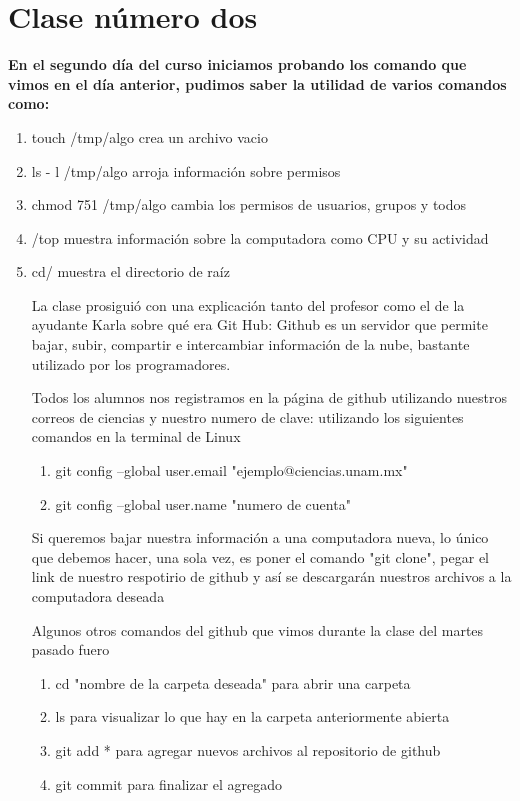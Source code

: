 \documentclass{book}
\begin{document}
\chapter{Clase número dos}
\textbf{En el segundo día del curso iniciamos probando los comando que vimos en el día anterior, pudimos saber la utilidad  de varios comandos como:}


\begin{enumerate}
	\item touch /tmp/algo crea un archivo vacio
	\item ls - l /tmp/algo arroja información sobre permisos
	\item chmod 751 /tmp/algo cambia los permisos de usuarios, grupos y todos
	\item /top muestra información sobre la computadora como CPU y su actividad
	\item cd/ muestra el directorio de raíz
	
	La clase prosiguió con una explicación tanto del profesor como el de la ayudante Karla sobre qué era Git Hub:
	Github es un servidor que permite bajar, subir, compartir e intercambiar información de la nube, bastante utilizado por los programadores.
	
	Todos los alumnos nos registramos en la página de github utilizando nuestros correos de ciencias y nuestro numero de clave: 
	utilizando los siguientes comandos en la terminal de Linux
	
	
	\begin{enumerate}
		\item git config --global user.email "ejemplo@ciencias.unam.mx"
		\item git config --global user.name "numero de cuenta"
		
	\end{enumerate}
	Si queremos bajar nuestra información a una computadora nueva, lo único que debemos hacer, una sola vez, es poner el comando "git clone", pegar el link de nuestro respotirio de github y así se descargarán nuestros archivos a la computadora deseada
	
	Algunos otros comandos del github que vimos durante la clase del martes pasado fuero
	
	\begin{enumerate}
		\item cd "nombre de la carpeta deseada" para abrir una carpeta
		\item ls para visualizar lo que hay en la carpeta anteriormente abierta
		\item git add * para agregar nuevos archivos al repositorio de github
		\item git commit para finalizar el agregado
		

\end{enumerate}
\end{enumerate}
\end{document}
